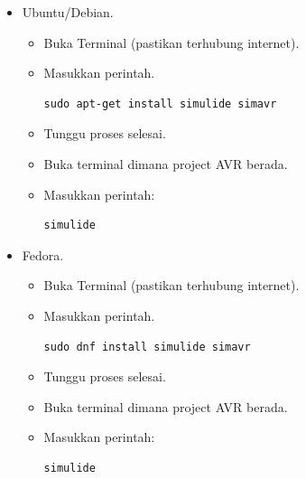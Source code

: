 \documentclass[12pt,]{article}
\begin{document}
\begin{itemize}
\begin{itemize}
		\end{itemize}
		
		\item Ubuntu/Debian.
		\begin{itemize}
			\item Buka Terminal (pastikan terhubung internet).
			\item Masukkan perintah.
			\begin{verbatim}
sudo apt-get install simulide simavr
			\end{verbatim}
			\item Tunggu proses selesai.
			\item Buka terminal dimana project AVR berada.
			\item Masukkan perintah:
			\begin{verbatim}
simulide
			\end{verbatim}
		\end{itemize}
		
		\item Fedora.
		\begin{itemize}
			\item Buka Terminal (pastikan terhubung internet).
			\item Masukkan perintah.
			\begin{verbatim}
sudo dnf install simulide simavr
			\end{verbatim}
			\item Tunggu proses selesai.
			\item Buka terminal dimana project AVR berada.
			\item Masukkan perintah:
			\begin{verbatim}
simulide
			\end{verbatim}
		\end{itemize}
		

\end{itemize}
\end{document}
